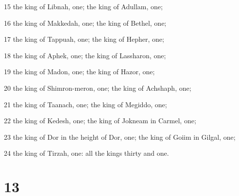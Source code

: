 \par 15 the king of Libnah, one; the king of Adullam, one;
\par 16 the king of Makkedah, one; the king of Bethel, one;
\par 17 the king of Tappuah, one; the king of Hepher, one;
\par 18 the king of Aphek, one; the king of Lassharon, one;
\par 19 the king of Madon, one; the king of Hazor, one;
\par 20 the king of Shimron-meron, one; the king of Achshaph, one;
\par 21 the king of Taanach, one; the king of Megiddo, one;
\par 22 the king of Kedesh, one; the king of Jokneam in Carmel, one;
\par 23 the king of Dor in the height of Dor, one; the king of Goiim in Gilgal, one;
\par 24 the king of Tirzah, one: all the kings thirty and one.

\chapter{13}


